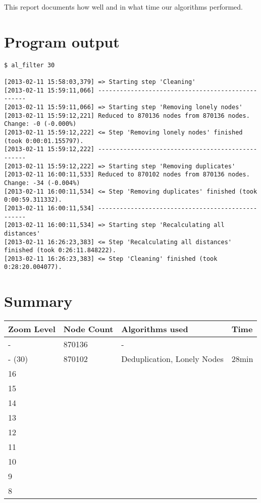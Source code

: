 \documentclass[twoside]{scrartcl}
\begin{document}
This report documents how well and in what time our algorithms performed.

\section{Program output}
\begin{verbatim}
$ al_filter 30

[2013-02-11 15:58:03,379] => Starting step 'Cleaning'
[2013-02-11 15:59:11,066] --------------------------------------------------
[2013-02-11 15:59:11,066] => Starting step 'Removing lonely nodes'
[2013-02-11 15:59:12,221] Reduced to 870136 nodes from 870136 nodes. Change: -0 (-0.000%)
[2013-02-11 15:59:12,222] <= Step 'Removing lonely nodes' finished (took 0:00:01.155797).
[2013-02-11 15:59:12,222] --------------------------------------------------
[2013-02-11 15:59:12,222] => Starting step 'Removing duplicates'
[2013-02-11 16:00:11,533] Reduced to 870102 nodes from 870136 nodes. Change: -34 (-0.004%)
[2013-02-11 16:00:11,534] <= Step 'Removing duplicates' finished (took 0:00:59.311332).
[2013-02-11 16:00:11,534] --------------------------------------------------
[2013-02-11 16:00:11,534] => Starting step 'Recalculating all distances'
[2013-02-11 16:26:23,383] <= Step 'Recalculating all distances' finished (took 0:26:11.848222).
[2013-02-11 16:26:23,383] <= Step 'Cleaning' finished (took 0:28:20.004077).
\end{verbatim}

\section{Summary}
\begin{tabular}{l | l | l | l}
    Zoom Level & Node Count & Algorithms used & Time\\
    \hline
    - & 870136 & - \\
    - (30) & 870102 & Deduplication, Lonely Nodes & 28min\\
    16 & & \\
    15 & & \\
    14 & & \\
    13 & & \\
    12 & & \\
    11 & & \\
    10 & & \\
    9 & & \\
    8 & & \\
\end{tabular}
\end{document}
